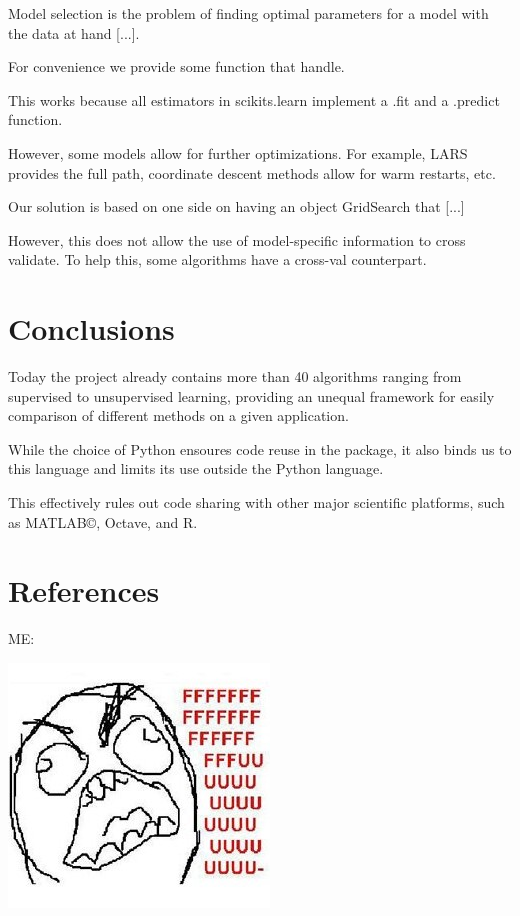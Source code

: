 \documentclass[twoside,11pt]{article}
\begin{document}
Model selection is the problem of finding optimal parameters for a
model with the data at hand [...].

For convenience we provide some function that handle.

This works because all estimators in scikits.learn implement a .fit
and a .predict function.


However, some models allow for further optimizations. For example,
LARS provides the full path, coordinate descent methods allow for warm
restarts, etc.


Our solution is based on one side on having an object GridSearch that
[...] 

However, this does not allow the use of model-specific information to
cross validate. To help this, some algorithms have a cross-val
counterpart.


\section{Conclusions}

Today the project already contains more than 40 algorithms ranging
from supervised to unsupervised learning, providing an unequal
framework for easily comparison of different methods on a given
application.



While the choice of Python ensoures code reuse in the package, it also
binds us to this language and limits its use outside the Python
language.

This effectively rules out code sharing with other major scientific
platforms, such as MATLAB©, Octave, and R.



\section{References}

ME:

\includegraphics{images/parafaber.jpg}
\end{document}
